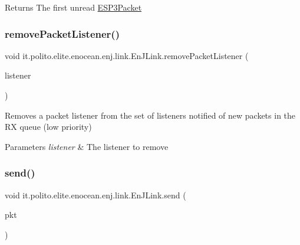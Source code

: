 \begin{DoxyReturn}{Returns}
The first unread \hyperlink{}{E\+S\+P3\+Packet} 
\end{DoxyReturn}
\hypertarget{classit_1_1polito_1_1elite_1_1enocean_1_1enj_1_1link_1_1_en_j_link_aa1d6dad3b4b99efa4357844a4a16772f}{}\label{classit_1_1polito_1_1elite_1_1enocean_1_1enj_1_1link_1_1_en_j_link_aa1d6dad3b4b99efa4357844a4a16772f} 
\subsubsection{\texorpdfstring{remove\+Packet\+Listener()}{removePacketListener()}}
{\footnotesize\ttfamily void it.\+polito.\+elite.\+enocean.\+enj.\+link.\+En\+J\+Link.\+remove\+Packet\+Listener (\begin{DoxyParamCaption}\item[{\hyperlink{interfaceit_1_1polito_1_1elite_1_1enocean_1_1enj_1_1link_1_1_packet_listener}{Packet\+Listener}}]{listener }\end{DoxyParamCaption})}

Removes a packet listener from the set of listeners notified of new packets in the RX queue (low priority)


\begin{DoxyParams}{Parameters}
{\em listener} & The listener to remove \\
\hline
\end{DoxyParams}
\hypertarget{classit_1_1polito_1_1elite_1_1enocean_1_1enj_1_1link_1_1_en_j_link_a8ac1d0adfde9fe7674be3a841bd17ccc}{}\label{classit_1_1polito_1_1elite_1_1enocean_1_1enj_1_1link_1_1_en_j_link_a8ac1d0adfde9fe7674be3a841bd17ccc} 
\subsubsection{\texorpdfstring{send()}{send()}\hspace{0.1cm}{\footnotesize\ttfamily [1/2]}}
{\footnotesize\ttfamily void it.\+polito.\+elite.\+enocean.\+enj.\+link.\+En\+J\+Link.\+send (\begin{DoxyParamCaption}\item[{\hyperlink{classit_1_1polito_1_1elite_1_1enocean_1_1protocol_1_1serial_1_1v3_1_1network_1_1packet_1_1_e_s_p3_packet}{E\+S\+P3\+Packet}}]{pkt }\end{DoxyParamCaption})}

